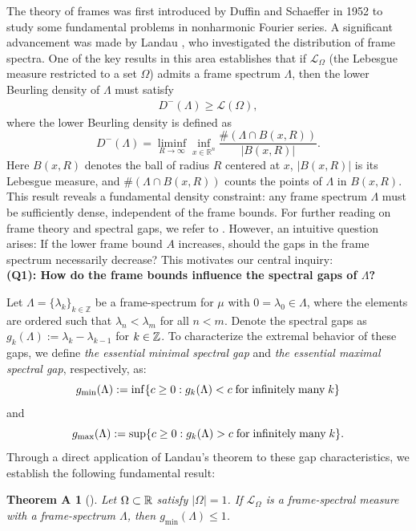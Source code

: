 \documentclass[12pt,psfig,reqno]{amsart}
\numberwithin{equation}{section}
\theoremstyle{plain}
\newtheorem*{thmA}{Theorem A}
\begin{document}
The theory of frames was first introduced by  Duffin and Schaeffer \cite{DS52} in 
1952 to study some fundamental problems in nonharmonic Fourier series. 
A significant advancement was made by Landau  \cite{Lan67}, who investigated the distribution of frame spectra. One of the key results in this area establishes that if \( \mathcal{L}_\Omega \) (the Lebesgue measure restricted to a set \(\Omega\)) admits a frame spectrum $\Lambda$, then the lower Beurling density of $\Lambda$ must satisfy 
\begin{align*}
	D^-(\Lambda)\geq \mathcal{L}(\Omega), 
\end{align*} where the lower Beurling density is defined as 
\[
D^-(\Lambda) = \liminf_{R \to \infty} \inf_{x \in \mathbb{R}^n} \frac{\#(\Lambda \cap B(x, R))}{|B(x, R)|}. 
\]
Here \( B(x, R) \) denotes the ball of radius \( R \) centered at \( x \), \( |B(x, R)| \) is its Lebesgue measure, and \( \#(\Lambda \cap B(x, R)) \) counts the points of \( \Lambda \) in \( B(x, R) \). 
This result reveals a fundamental density constraint: any frame spectrum $\Lambda$ must be sufficiently dense, independent of the frame bounds. For further reading on frame theory and spectral gaps, we refer to \cite{Chr03,Hei11,IP00, KL16, OS02}. 
However, an intuitive question arises: If the lower frame bound $A$ increases, should the gaps in the frame spectrum necessarily decrease? This motivates our central inquiry:
\\
	\textbf{(Q1): How do the frame bounds influence the spectral gaps of $\Lambda$?}

Let $\Lambda = \{\lambda_k\}_{k\in\mathbb{Z}}$ be a frame-spectrum for $\mu$ with $0 = \lambda_0 \in \Lambda$, where the elements are ordered such that $\lambda_n < \lambda_m$ for all $n < m$. 
Denote the spectral gaps as $g_k(\Lambda):=\lambda_k-\lambda_{k-1}$ for $k\in\Bbb Z$. 
To characterize the extremal behavior of these gaps, we define \textit{the essential minimal spectral gap} and \textit{the essential maximal spectral gap}, respectively, as:
\[
g_{\min}(\Lambda) := \inf\{c\geq0:g_k(\Lambda)<c\;\text{for\;infinitely\;many\;}k\}
\]
and 
\[
g_{\max}(\Lambda) := \sup\{c\geq0:g_k(\Lambda)>c\;\text{for\;infinitely\;many\;}k\}.
\]
Through a direct application of Landau's theorem to these gap characteristics, we establish the following fundamental result: 
\begin{thmA}[\cite{Lan67}]\label{thma}
Let $\Omega\subset\Bbb R$ satisfy $|\Omega|=1$. 
If $\mathcal{L}_{\Omega}$ is a frame-spectral measure with a frame-spectrum $\Lambda$, then $g_{\min}(\Lambda)\leq 1$. 
\end{thmA}
\end{document}
